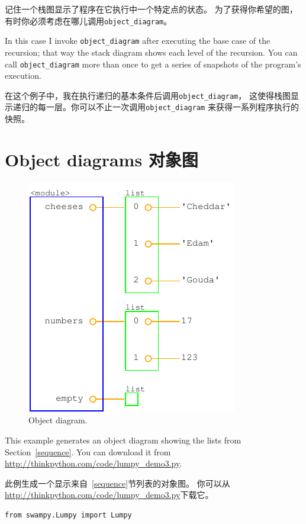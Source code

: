 \documentclass[10pt]{book}
\begin{document}
\begin{CJK}{UTF8}{gbsn}
记住一个栈图显示了程序在它执行中一个特定点的状态。
为了获得你希望的图，有时你必须考虑在哪儿调用\verb"object_diagram"。

In this case I invoke \verb"object_diagram" after executing the base
case of the recursion; that way the stack diagram shows each level of
the recursion.  You can call \verb"object_diagram" more than once to
get a series of snapshots of the program's execution.

在这个例子中，我在执行递归的基本条件后调用\verb"object_diagram"，
这使得栈图显示递归的每一层。你可以不止一次调用\verb"object_diagram"
来获得一系列程序执行的快照。


\section{Object diagrams 对象图}

\begin{figure}
\centerline
{\includegraphics[scale=0.7]{figs/lumpydemo3.pdf}}
\caption{Object diagram.}
\label{fig.lumpy3}
\end{figure}

This example generates an object diagram showing the lists from
Section~\ref{sequence}.  You can download it from
\url{http://thinkpython.com/code/lumpy_demo3.py}.

此例生成一个显示来自~\ref{sequence}节列表的对象图。
你可以从\url{http://thinkpython.com/code/lumpy_demo3.py}下载它。

\begin{verbatim}
from swampy.Lumpy import Lumpy


\end{verbatim}
\end{CJK}
\end{document}

